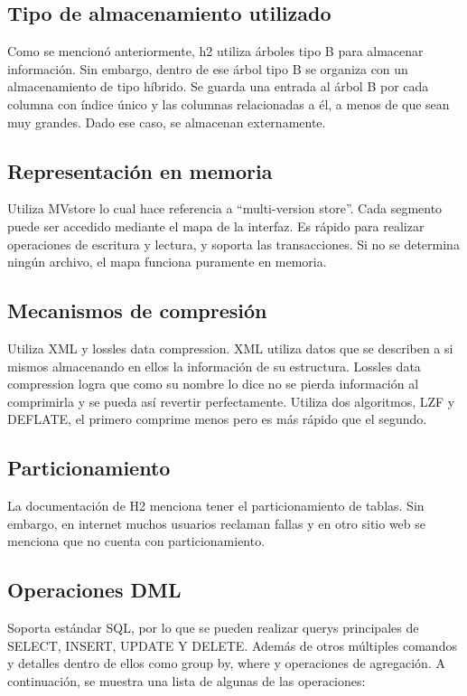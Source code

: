 \documentclass{acmart}
\begin{document}
\subsection{Tipo de almacenamiento utilizado}
Como se mencionó anteriormente, h2 utiliza árboles tipo B para almacenar información. Sin embargo, dentro de ese árbol tipo B se organiza con un almacenamiento de tipo híbrido. Se guarda una entrada al árbol B por cada columna con índice único y las columnas relacionadas a él, a menos de que sean muy grandes. Dado ese caso, se almacenan externamente.   

\subsection{Representación en memoria}
Utiliza MVstore lo cual hace referencia a “multi-version store”. Cada segmento puede ser accedido mediante el mapa de la interfaz. Es rápido para realizar operaciones de escritura y lectura, y soporta las transacciones. Si no se determina ningún archivo, el mapa funciona puramente en memoria. 

\subsection{Mecanismos de compresión}
Utiliza XML y lossles data compression. 
XML utiliza datos que se describen a si mismos almacenando en ellos la información de su estructura. Lossles data compression logra que como su nombre lo dice no se pierda información al comprimirla y se pueda así revertir perfectamente.  Utiliza dos algoritmos, LZF y DEFLATE, el primero comprime menos pero es más rápido que el segundo.  



\subsection{Particionamiento}
La documentación de H2 menciona tener el particionamiento de tablas. Sin embargo, en internet muchos usuarios reclaman fallas y en otro sitio web se menciona que no cuenta con particionamiento. 


\subsection{Operaciones DML}
Soporta estándar SQL, por lo que se pueden realizar querys principales de SELECT, INSERT, UPDATE Y DELETE.  Además de otros múltiples comandos y detalles dentro de ellos como group by, where y operaciones de agregación. 
A continuación, se muestra una lista de algunas de las operaciones:
\end{document}
